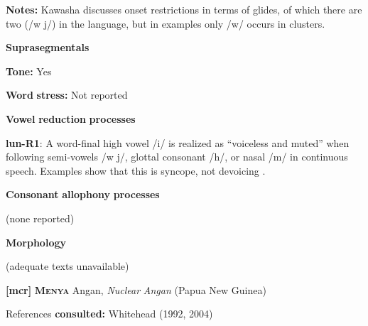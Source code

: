\begin{styleBody}
\textbf{Notes:} Kawasha discusses onset restrictions in terms of glides, of which there are two (/w j/) in the language, but in examples only /w/ occurs in clusters.
\end{styleBody}

\begin{styleBody}
\textbf{Suprasegmentals}
\end{styleBody}

\begin{styleBody}
\textbf{Tone:} Yes
\end{styleBody}

\begin{styleBody}
\textbf{Word} \textbf{stress:} Not reported
\end{styleBody}

\begin{styleBody}
\textbf{Vowel} \textbf{reduction} \textbf{processes}
\end{styleBody}

\begin{styleBody}
\textbf{lun-R1}: A word-final high vowel /i/ is realized as “voiceless and muted” when following semi-vowels /w j/, glottal consonant /h/, or nasal /m/ in continuous speech. Examples show that this is syncope, not devoicing \citep[37-8]{Kawasha2003}.
\end{styleBody}

\begin{styleBody}
\textbf{Consonant} \textbf{allophony} \textbf{processes}
\end{styleBody}

\begin{styleBody}
(none reported)
\end{styleBody}

\begin{styleBody}
\textbf{Morphology}
\end{styleBody}

\begin{styleBody}
(adequate texts unavailable)
\end{styleBody}

\begin{styleBody}
\textbf{[mcr]}   \textbf{\textsc{Menya}}    Angan, \textit{Nuclear} \textit{Angan} (Papua New Guinea)
\end{styleBody}

\begin{styleBody}
References \textbf{consulted:} Whitehead (1992, 2004)
\end{styleBody}

